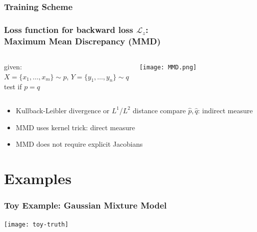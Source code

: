 \documentclass[aspectratio=43]{beamer}
\begin{document}
\begin{frame}
	\frametitle{Training Scheme}
	\begin{center}	
		\cite{Ardizzone2_2019}
	\end{center}
\end{frame}



\begin{frame}
	\frametitle{Loss function for backward loss $\mathcal{L}_z$:\\Maximum Mean Discrepancy (MMD)}
	\begin{columns}[T]
		\column{5cm}
			given:\\ $X=\{x_1, \ldots, x_m\} \sim p$, $Y=\{y_1, \ldots, y_n\} \sim q$\\
			\alert{test if $p=q$} 
		\column{5cm}
			\begin{center}
				\texttt{[image: MMD.png]}\cite{Smola2006}
			\end{center}
	\end{columns}
	\begin{itemize}
		\item<1->Kullback-Leibler divergence or $L^1$/$L^2$ distance compare $\hat p, \hat q$: \alert{indirect measure}
		\item<2->MMD uses kernel trick: \alert{direct measure}
		\item<2->MMD does \alert{not require explicit Jacobians}
	\end{itemize}
\end{frame}


\section{Examples}

\begin{frame}
	\frametitle{Toy Example: Gaussian Mixture Model}
	\begin{description}
		\item<1->\texttt{[image: toy-truth]}\cite{Ardizzone2_2019}
		\item<2->
	\end{description}
\end{frame}
\end{document}
